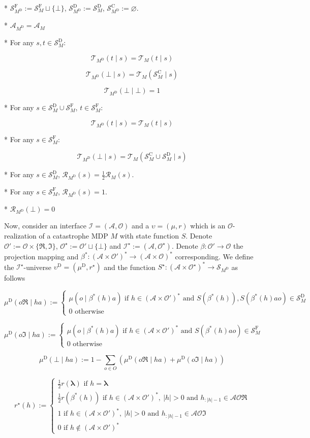 \documentclass[a4paper]{article}
\newcommand{\AP}[1]{\left(#1\right)}
\newcommand{\Estr}{\boldsymbol{\lambda}}
\newcommand{\Abs}[1]{\left\vert #1 \right\vert}
\newcommand{\Ob}{\mathcal{O}}
\newcommand{\A}{\mathcal{A}}
\newcommand{\St}{\mathcal{S}}
\newcommand{\T}{\mathcal{T}}
\newcommand{\R}{\mathcal{R}}
\newcommand{\In}{\mathcal{I}}
\newcommand{\RMC}{\mathrm{C}}
\newcommand{\RMD}{\mathrm{D}}
\newcommand{\RMF}{\mathrm{F}}
\newcommand{\SF}{\St^{\RMF}}
\newcommand{\SD}{\St^{\RMD}}
\newcommand{\SC}{\St^{\RMC}}
\newcommand{\MD}{M^{\RMD}}
\newcommand{\UD}{\upsilon^{\RMD}}
\begin{document}
* $\SF_{\MD}:=\SF_M \sqcup \{\bot\}$, $\SD_{\MD}:=\SD_M$, $\SC_{\MD}:=\varnothing$.

* $\A_{\MD} = \A_M$

* For any $s,t \in \SD_M$:

$$\T_{\MD}(t \mid s) = \T_M(t \mid s)$$

$$\T_{\MD}(\bot \mid s) = \T_M(\SC_M \mid s)$$

$$\T_{\MD}(\bot \mid \bot) = 1$$

* For any $s \in \SD_M \cup \SF_M$, $t \in \SF_M$:

$$\T_{\MD}(t \mid s) = \T_M(t \mid s)$$

* For any $s \in \SF_M$:

$$\T_{\MD}(\bot \mid s) = \T_M(\SC_M \cup \SD_M \mid s)$$

* For any $s \in \SD_M$, $\R_{\MD}(s) = \frac{1}{2}\R_M(s)$.

* For any $s \in \SF_M$, $\R_{\MD}(s) = 1$.

* $\R_{\MD}(\bot) = 0$

Now, consider an interface $\In=(\A,\Ob)$ and a $\upsilon=(\mu,r)$ which is an $\Ob$-realization of a catastrophe MDP $M$ with state function $S$. Denote $\Ob':=\Ob\times\{\Re,\Im\}$, $\Ob^\star:=\Ob' \sqcup \{\bot\}$ and $\In^\star:=(\A,\Ob^\star)$. Denote $\beta: \Ob' \rightarrow \Ob$ the projection mapping and $\beta^*: \AP{\A \times \Ob'}^* \rightarrow \AP{\A \times \Ob}^*$ corresponding. We define the $\In^\star$-universe $\UD=(\mu^\RMD,r^\star)$ and the function $S^\star: \AP{\A \times \Ob^\star}^* \rightarrow \St_{\MD}$ as follows

$$\mu^\RMD(o\Re \mid ha) := \begin{cases} \mu\AP{o \mid \beta^*(h)a} \text{ if } h\in\AP{\A \times \Ob'}^* \text{ and } S\AP{\beta^*(h)},S\AP{\beta^*(h)ao}\in\SD_M \\ 0 \text{ otherwise} \end{cases}$$

$$\mu^\RMD(o\Im \mid ha) := \begin{cases} \mu\AP{o \mid \beta^*(h)a} \text{ if } h\in\AP{\A \times \Ob'}^* \text{ and } S\AP{\beta^*(h)ao}\in\SF_M \\ 0 \text{ otherwise} \end{cases}$$

$$\mu^\RMD(\bot \mid ha) := 1 - \sum_{o \in O} \AP{\mu^\RMD(o\Re \mid ha) + \mu^\RMD(o\Im \mid ha)}$$

$$r^\star(h):=\begin{cases} \frac{1}{2}r(\Estr) \text{ if } h = \Estr \\ \frac{1}{2}r\AP{\beta^*(h)} \text{ if } h\in\AP{\A \times \Ob'}^*,\ \Abs{h}>0 \text{ and } h_{:\Abs{h}-1}\in\A\Ob\Re \\ 1 \text{ if } h\in\AP{\A \times \Ob'}^*,\ \Abs{h}>0 \text{ and } h_{:\Abs{h}-1}\in\A\Ob\Im \\ 0 \text{ if } h\not\in\AP{\A \times \Ob'}^* \end{cases}$$
\end{document}
